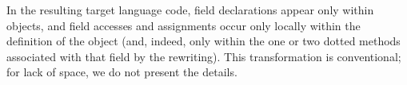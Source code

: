 
In the resulting target language code, field declarations appear only within objects,
and field accesses and assignments occur only locally within the definition
of the object (and, indeed, only within the one or two dotted methods associated with
that field by the rewriting).
This transformation is conventional; for lack of space, we do not present the details.

